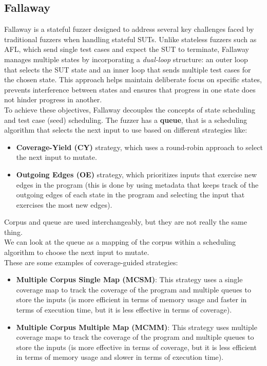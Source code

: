\subsection{Fallaway}
Fallaway \cite{Fallaway} is a stateful fuzzer designed to address several key challenges faced by traditional fuzzers when handling stateful SUTs. Unlike stateless fuzzers such as AFL, which send single test cases and expect the SUT to terminate, Fallaway manages multiple states by incorporating a \textit{dual-loop} structure: an outer loop that selects the SUT state and an inner loop that sends multiple test cases for the chosen state. This approach helps maintain deliberate focus on specific states, prevents interference between states and ensures that progress in one state does not hinder progress in another.
\\To achieve these objectives, Fallaway decouples the concepts of state scheduling and test case (seed) scheduling.
The fuzzer has a \textbf{queue}, that is a scheduling algorithm that selects the next input to use based on different strategies like:
\begin{itemize}
    \item \textbf{Coverage-Yield (CY)} strategy, which uses a round-robin approach to select the next input to mutate.
    \item \textbf{Outgoing Edges (OE)} strategy, which prioritizes inputs that exercise new edges in the program (this is done by using metadata that keeps track of the outgoing edges of each state in the program and selecting the input that exercises the most new edges).
\end{itemize} 
Corpus and queue are used interchangeably, but they are not really the same thing. \\We can look at the queue as a mapping of the corpus within a scheduling algorithm to choose the next input to mutate.
\\These are some examples of coverage-guided strategies:
\begin{itemize}
    \item \textbf{Multiple Corpus Single Map (MCSM)}: This strategy uses a single coverage map to track the coverage of the program and multiple queues to store the inputs (is more efficient in terms of memory usage and faster in terms of execution time, but it is less effective in terms of coverage).
    
    \item \textbf{Multiple Corpus Multiple Map (MCMM)}: This strategy uses multiple coverage maps to track the coverage of the program and multiple queues to store the inputs (is more effective in terms of coverage, but it is less efficient in terms of memory usage and slower in terms of execution time).
\end{itemize}
